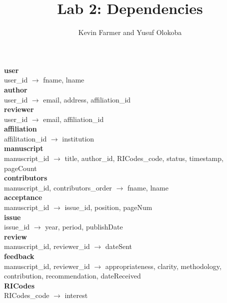 \documentclass{article}
\title{Lab 2: Dependencies}
\author{Kevin Farmer and Yusuf Olokoba}
\newcommand{\ra}{$\rightarrow$ }
\begin{document}
\maketitle


\textbf{user} \\
user\_id \ra fname, lname \\

\textbf{author} \\
user\_id \ra email, address, affiliation\_id \\

\textbf{reviewer} \\
user\_id \ra email, affiliation\_id \\

\textbf{affiliation} \\
affilitation\_id \ra institution \\

\textbf{manuscript} \\
manuscript\_id \ra title, author\_id, RICodes\_code, status, timestamp, pageCount \\

\textbf{contributors} \\
manuscript\_id, contributors\_order \ra fname, lname \\

\textbf{acceptance} \\
manuscript\_id \ra issue\_id, position, pageNum \\

\textbf{issue} \\
issue\_id \ra year, period, publishDate \\

\textbf{review} \\
manuscript\_id, reviewer\_id \ra dateSent \\

\textbf{feedback} \\
manuscript\_id, reviewer\_id \ra appropriateness, clarity, methodology, contribution, recommendation, dateReceived \\

\textbf{RICodes} \\
RICodes\_code \ra interest \\
\end{document}
